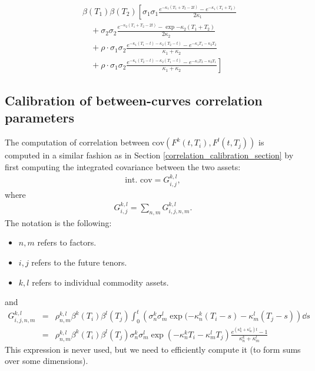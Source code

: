 \documentclass[12pt]{article}
\begin{document}
\begin {eqnarray*}
  &  & 
   \beta(T_1) \beta(T_2) \left[ \sigma_1 \sigma_1\frac {e^{ -\kappa_1 (T_1 + T_2 - 2t) } - 
    e^{ -\kappa_1 (T_1 + T_2) } } {2\kappa_1 } \right.
  \\
  & & 
  \quad + 
  \sigma_2 \sigma_2 \frac { e^{ -\kappa_2 (T_1 + T_2 - 2t) } - 
    \exp { - \kappa_2 (T_1 + T_2) } } 
        { 2 \kappa_2} 
  \\
  &  & 
  \quad +
  \rho \cdot 
  \sigma_1 \sigma_2 \frac { 
    e^{ -\kappa_1 (T_1 - t) - \kappa_2 (T_2 - t) } - e^{- \kappa_1 T_1 - \kappa_2 T_2 } } 
        {\kappa_1 + \kappa_2 } 
  \\
  &  & \left.
  \quad +
  \rho \cdot 
  \sigma_1 \sigma_2 \frac {
    e^{ -\kappa_1 (T_2 - t) - \kappa_2 (T_1 - t) } - e^{- \kappa_1 T_2 - \kappa_2 T_1 } } 
        {\kappa_1 + \kappa_2} \right]
\end {eqnarray*}



\subsection {Calibration of between-curves correlation parameters}
\label {between_curves_correlation_calibration_section}

The computation of correlation between $\textrm {cov} (F^k (t,T_i), F^l (t,T_j))$ is 
computed in a similar fashion as in Section \ref {correlation_calibration_section} 
by first computing the integrated covariance between the two assets: 
\begin {eqnarray}
  \textrm {int. cov} = G^{k,l}_{i,j}, 
\end {eqnarray}
where 
\begin {eqnarray*}
  G^{k,l}_{i,j} = \sum_{n,m} G^{k,l}_{i,j,n,m} .
\end {eqnarray*}
The notation is the following: 
\begin {itemize}
\item $n,m$ refers to factors.
\item $i,j$ refers to the future tenors. 
\item $k,l$ refers to individual commodity assets.
\end {itemize}
and 
\begin {eqnarray*}
  G^{k,l}_{i,j,n,m}  & = & \rho ^{k,l}_{n, m} \beta^k (T_i) \beta^l (T_j) \int_0^t \left( \sigma_n^k \sigma_m^l 
  \exp( - \kappa^k_n (T_i - s) - \kappa^l _m (T_j - s) \right) \dd s
  \\
  & = & \rho ^{k,l}_{n, m} \beta^k (T_i) \beta^l (T_j) \sigma_n^k \sigma_m^l 
  \exp (-\kappa^k_n T_i - \kappa^l_m T_j ) 
  \frac { e^{(\kappa^k_n + \kappa^l_m) t} - 1} 
        {\kappa^k_n + \kappa^l_m}
\end {eqnarray*}
%
This expression is never used, but we need to efficiently compute it (to form sums over some dimensions).
\end{document}
